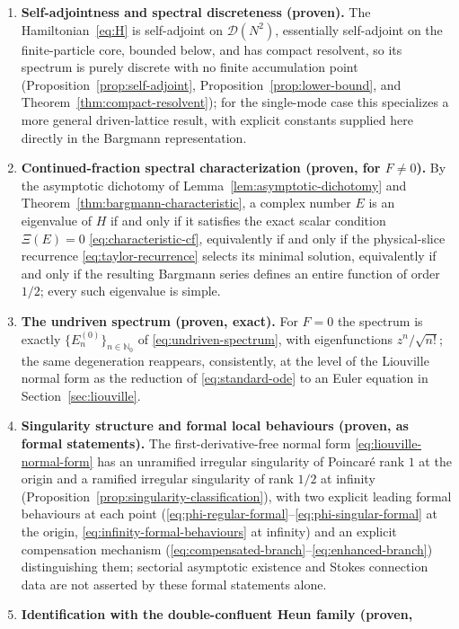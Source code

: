 \documentclass[11pt]{article}
\theoremstyle{remark}
\newcommand{\Dom}{\mathcal{D}}
\newcommand{\Nzero}{\mathbb{N}_{0}}
\begin{document}
\begin{enumerate}
\item \textbf{Self-adjointness and spectral discreteness (proven).} The
 Hamiltonian~\eqref{eq:H} is self-adjoint on $\Dom(N^2)$, essentially
 self-adjoint on the finite-particle core, bounded below, and has compact
 resolvent, so its spectrum is purely discrete with no finite accumulation
 point (Proposition~\ref{prop:self-adjoint}, Proposition~\ref{prop:lower-bound},
 and Theorem~\ref{thm:compact-resolvent}); for the single-mode case this specializes a
 more general driven-lattice result, with explicit constants supplied here
 directly in the Bargmann representation.
\item \textbf{Continued-fraction spectral characterization (proven, for
 $F\ne0$).} By the asymptotic dichotomy of
 Lemma~\ref{lem:asymptotic-dichotomy} and
 Theorem~\ref{thm:bargmann-characteristic}, a complex number $E$ is an
 eigenvalue of $H$ if and only if it satisfies the exact scalar condition
 $\Xi(E)=0$ \eqref{eq:characteristic-cf}, equivalently if and only if the
 physical-slice recurrence \eqref{eq:taylor-recurrence} selects its minimal
 solution, equivalently if and only if the resulting Bargmann series
 defines an entire function of order $1/2$; every such eigenvalue is
 simple.
\item \textbf{The undriven spectrum (proven, exact).} For $F=0$ the
 spectrum is exactly $\{E_n^{(0)}\}_{n\in\Nzero}$ of
 \eqref{eq:undriven-spectrum}, with eigenfunctions $z^n/\sqrt{n!}$; the same
 degeneration reappears, consistently, at the level of the Liouville normal
 form as the reduction of \eqref{eq:standard-ode} to an Euler equation in
 Section~\ref{sec:liouville}.
\item \textbf{Singularity structure and formal local behaviours (proven,
 as formal statements).} The first-derivative-free normal form
 \eqref{eq:liouville-normal-form} has an unramified irregular singularity
 of Poincar\'e rank $1$ at the origin and a ramified irregular singularity
 of rank $1/2$ at infinity (Proposition~\ref{prop:singularity-classification}),
 with two explicit leading formal behaviours at each point
 (\eqref{eq:phi-regular-formal}--\eqref{eq:phi-singular-formal} at the
 origin, \eqref{eq:infinity-formal-behaviours} at infinity) and an explicit
 compensation mechanism
 (\eqref{eq:compensated-branch}--\eqref{eq:enhanced-branch}) distinguishing
 them; sectorial asymptotic existence and Stokes connection data are not
 asserted by these formal statements alone.
\item \textbf{Identification with the double-confluent Heun family (proven,
}
\end{enumerate}
\end{document}
